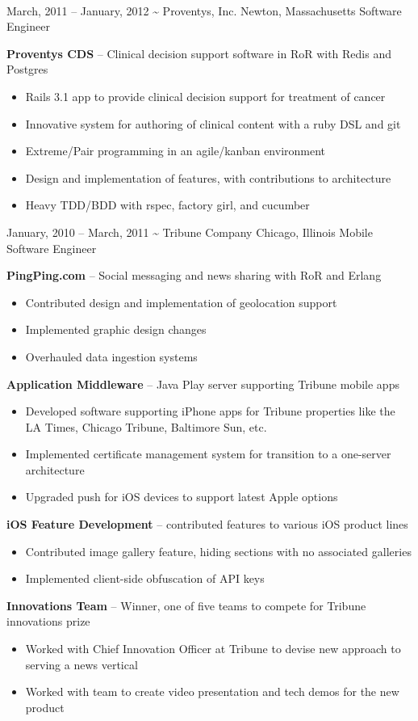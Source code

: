 \documentclass[]{friggeri-cv}
\begin{document}
\begin{entrylist}
    \\[1cm]%
    \entryalt
    {March, 2011 -- January, 2012}
    {\textbf{\textasciitilde} Proventys, Inc.}
    {Newton, Massachusetts}
    {Software Engineer}
    {\textbf{Proventys CDS} -- Clinical decision support software in RoR with Redis and Postgres
    \begin{itemize}
      \item Rails 3.1 app to provide clinical decision support for treatment of cancer
      \item Innovative system for authoring of clinical content with a ruby DSL and git
      \item Extreme/Pair programming in an agile/kanban environment
      \item Design and implementation of features, with contributions to architecture
      \item Heavy TDD/BDD with rspec, factory girl, and cucumber
    \end{itemize}}

    \entryalt
    {January, 2010 -- March, 2011}
    {\textbf{\textasciitilde} Tribune Company}
    {Chicago, Illinois}
    {Mobile Software Engineer}
    {\textbf{PingPing.com} -- Social messaging and news sharing with RoR and Erlang
    \begin{itemize}
      \item Contributed design and implementation of geolocation support
      \item Implemented graphic design changes
      \item Overhauled data ingestion systems
    \end{itemize}
    \textbf{Application Middleware} -- Java Play server supporting Tribune mobile apps
    \begin{itemize}
      \item Developed software supporting iPhone apps for Tribune properties like the LA Times, Chicago Tribune, Baltimore Sun, etc.
      \item Implemented certificate management system for transition to a one-server architecture
      \item Upgraded push for iOS devices to support latest Apple options
    \end{itemize}
    \textbf{iOS Feature Development} -- contributed features to various iOS product lines
    \begin{itemize}
      \item Contributed image gallery feature, hiding sections with no associated galleries
      \item Implemented client-side obfuscation of API keys
    \end{itemize}
    \textbf{Innovations Team} -- Winner, one of five teams to compete for Tribune innovations prize
    \begin{itemize}
      \item Worked with Chief Innovation Officer at Tribune to devise new approach to serving a news vertical
      \item Worked with team to create video presentation and tech demos for the new product
    \end{itemize}}


\end{entrylist}
\end{document}
